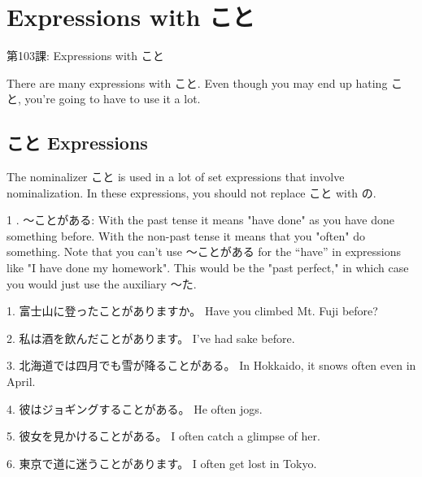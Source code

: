     
\chapter{Expressions with こと}

\begin{center}
\begin{Large}
第103課: Expressions with こと 
\end{Large}
\end{center}
 
\par{ There are many expressions with こと. Even though you may end up hating こと, you're going to have to use it a lot. }
      
\section{こと Expressions}
 
\par{ The nominalizer こと is used in a lot of set expressions that involve nominalization. In these expressions, you should not replace こと with の. }

\par{1 . ～ことがある: With the past tense it means "have done" as you have done something before. With the non-past tense it means that you "often" do something. Note that you can't use ～ことがある for the “have” in expressions like "I have done my homework". This would be the "past perfect," in which case you would just use the auxiliary ～た. }
 
\par{1. 富士山に登ったことがありますか。 \hfill\break
Have you climbed Mt. Fuji before? }
 
\par{2. 私は酒を飲んだことがあります。 \hfill\break
I've had sake before. }
 
\par{3. 北海道では四月でも雪が降ることがある。 \hfill\break
In Hokkaido, it snows often even in April. }
 
\par{4. 彼はジョギングすることがある。 \hfill\break
He often jogs. }
 
\par{5. 彼女を見かけることがある。 \hfill\break
I often catch a glimpse of her. }
 
\par{6. 東京で道に迷うことがあります。 \hfill\break
I often get lost in Tokyo. }
 
